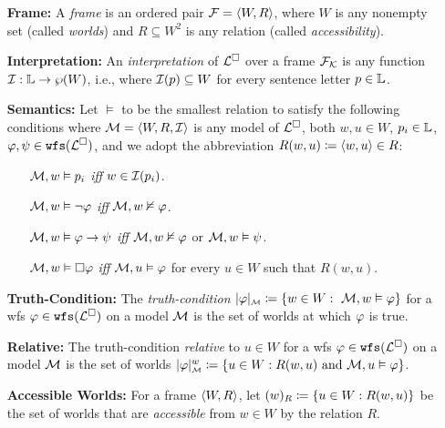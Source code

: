 \documentclass[a4paper, 11pt]{article} %
\begin{document}
\begin{enumerate}[leftmargin=1.2in] %
  \item[\bf Frame:] A \textit{frame} is an ordered pair $\mathcal{F} = \langle W,R\rangle$, where $W$ is any nonempty set (called \textit{worlds}) and $R \subseteq W^2$ is any relation (called \textit{accessibility}).
  \item[\bf Interpretation:] An \textit{interpretation} of $\mathcal{L}^{\square}$ over a frame $\mathcal{F}_{\mathcal{K}}$ is any function $\mathcal{I} : \mathbb{L} \to \wp(W)$, i.e., where $\mathcal{I}(p) \subseteq W$ for every sentence letter $p \in \mathbb{L}$.
  \item[\bf Semantics:] Let $\vDash$ to be the smallest relation to satisfy the following conditions where $\mathcal{M} = \langle W, R, \mathcal{I}\rangle$ is any model of $\mathcal{L}^{\square}$, both $w, u \in W$, $p_i \in \mathbb{L}$, $\varphi, \psi \in \texttt{wfs}(\mathcal{L}^{\square})$, and we adopt the abbreviation $R(w,u) \coloneq \langle w, u\rangle \in R$:
	      \begin{small}
		      \begin{itemize}[leftmargin=.36in]
			      \item[] $\mathcal{M}, w\vDash  p_i$ \textit{iff} $w \in \mathcal{I}(p_i)$.
			      \item[] $\mathcal{M}, w\vDash  \neg \varphi$ \textit{iff} $\mathcal{M}, w\nvDash \varphi$.
			      \item[] $\mathcal{M}, w\vDash  \varphi\rightarrow \psi$ \textit{iff} $\mathcal{M}, w\nvDash \varphi$ or $\mathcal{M}, w\vDash  \psi$.
            \item[] $\mathcal{M}, w\vDash  \Box \varphi$ \textit{iff} $\mathcal{M}, u\vDash \varphi$ for every $u \in W$ such that $R(w,u)$.
		      \end{itemize}
	      \end{small}
  \item[\bf Truth-Condition:] The \textit{truth-condition} $\lvert\varphi\rvert_{\scriptscriptstyle\mathcal{M}} \coloneq \lbrace w\in W: ~\mathcal{M}, w\vDash  \varphi\rbrace$ for a wfs $\varphi \in \texttt{wfs}(\mathcal{L}^{\square})$ on a model $\mathcal{M}$ is the set of worlds at which $\varphi$ is true.
  \item[\bf Relative:] The truth-condition \textit{relative} to $u \in W$ for a wfs $\varphi \in \texttt{wfs}(\mathcal{L}^{\square})$ on a model $\mathcal{M}$ is the set of worlds $\lvert\varphi\rvert_{\scriptscriptstyle\mathcal{M}}^w \coloneq \lbrace u\in W : R(w, u) \text{ and } \mathcal{M}, u\vDash  \varphi\rbrace$.
  \item[\bf Accessible Worlds:] For a frame $\langle W, R\rangle$, let $(w)_R \coloneq \lbrace u \in W : R(w,u)\rbrace$ be the set of worlds that are \textit{accessible} from $w \in W$ by the relation $R$.
\end{enumerate}
\end{document}
